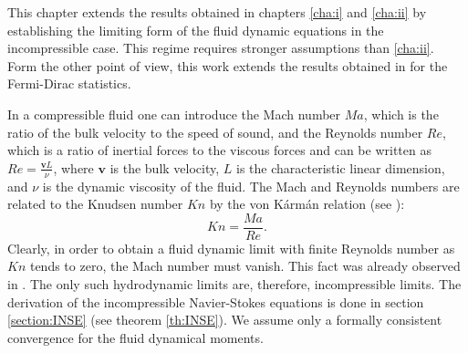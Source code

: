 




This chapter extends the results obtained in chapters \ref{cha:i} and \ref{cha:ii} by establishing the limiting form of the fluid dynamic equations in the incompressible case. This regime requires stronger assumptions than \ref{cha:ii}. Form the other point of view, this work extends the results obtained in \cite{Bardos1991Fluid} for the Fermi-Dirac statistics.

In a compressible fluid one can introduce the Mach number $M\!a$, which is the ratio  of the bulk velocity to the speed of sound, and the Reynolds number $Re$, which is a ratio of inertial forces to the viscous forces and can be written as $Re = \frac{\mathbf vL}{\nu}$, where $\mathbf v$ is the bulk velocity, $L$ is the characteristic linear dimension, and $\nu$ is the dynamic viscosity of the fluid. The Mach and Reynolds numbers are related to the Knudsen number $K\!n$ by the von K\'arm\'an relation (see \cite{karman1923gastheoretische}): \begin{equation}K\!n=\frac{M\!a}{Re}.\end{equation}
Clearly, in order to obtain a fluid dynamic limit with finite Reynolds number as $Kn$ tends to zero, the Mach number must vanish. This fact was already observed in \cite{Sone1969As}. The only such hydrodynamic limits are, therefore,  incompressible limits. The derivation of the incompressible Navier-Stokes equations is done in section \ref{section:INSE} (see theorem \ref{th:INSE}). We assume only  a formally consistent convergence for the fluid dynamical moments.%


